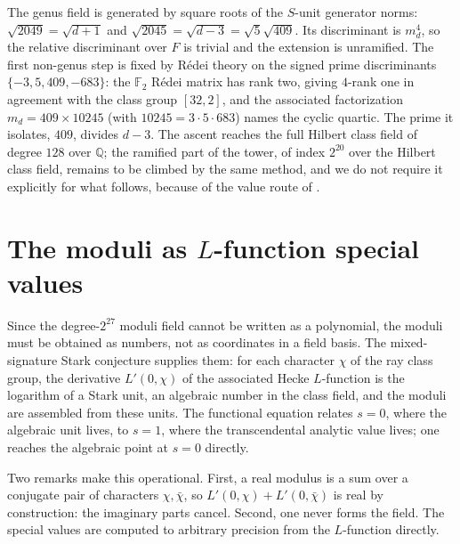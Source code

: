 \documentclass[12pt,a4paper]{article}
\newcommand{\Fd}{F}
\newcommand{\md}{m_d}
\begin{document}
The genus field is generated by square roots of the $S$-unit generator norms:
$\sqrt{2049} = \sqrt{d+1}$ and $\sqrt{2045}=\sqrt{d-3}=\sqrt{5}\sqrt{409}$.  Its
discriminant is $\md^{4}$, so the relative discriminant over $\Fd$ is trivial and
the extension is unramified.  The first non-genus step is fixed by R\'edei theory
on the signed prime discriminants $\{-3,5,409,-683\}$: the $\mathbb{F}_2$
R\'edei matrix has rank two, giving $4$-rank one in agreement with the class
group $[32,2]$, and the associated factorization $\md = 409\times 10245$ (with
$10245 = 3\cdot 5\cdot 683$) names the cyclic quartic.  The prime it isolates,
$409$, divides $d-3$.  The ascent reaches the full Hilbert class field of degree
$128$ over $\mathbb{Q}$; the ramified part of the tower, of index $2^{20}$ over
the Hilbert class field, remains to be climbed by the same method, and we do not
require it explicitly for what follows, because of the value route of
.

\section{The moduli as $L$-function special values}
\label{sec:portals}

Since the degree-$2^{27}$ moduli field cannot be written as a polynomial, the
moduli must be obtained as numbers, not as coordinates in a field basis.  The
mixed-signature Stark conjecture supplies them: for each character $\chi$ of the
ray class group, the derivative $L'(0,\chi)$ of the associated Hecke
$L$-function is the logarithm of a Stark unit, an algebraic number in the class
field, and the moduli are assembled from these units.  The functional equation
relates $s=0$, where the algebraic unit lives, to $s=1$, where the transcendental
analytic value lives; one reaches the algebraic point at $s=0$ directly.

Two remarks make this operational.  First, a real modulus is a sum over a
conjugate pair of characters $\chi,\bar\chi$, so
$L'(0,\chi)+L'(0,\bar\chi)$ is real by construction: the imaginary parts cancel.
Second, one never forms the field.  The special values are computed to arbitrary
precision from the $L$-function directly.
\end{document}
